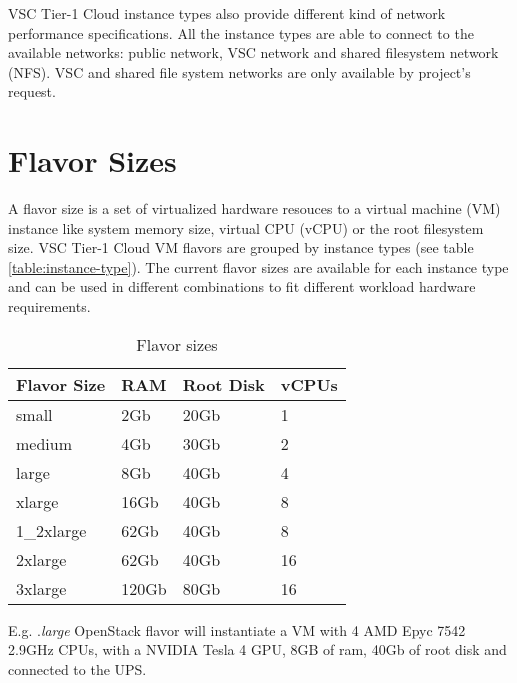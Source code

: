 VSC Tier-1 Cloud instance types also provide different kind of network
performance specifications. All the instance types are able to connect
to the available networks: public network, VSC network and shared filesystem
network (NFS). VSC and shared file system networks are only available
by project's request.

\section{Flavor Sizes}\label{sec:flavor-sizes}
A flavor size is a set of virtualized hardware resouces to a virtual
machine (VM) instance like system memory size, virtual CPU (vCPU)
or the root filesystem size.
VSC Tier-1 Cloud VM flavors are grouped by instance types
(see table \ref{table:instance-type}). The current flavor sizes are
available for each instance type and can be used in different
combinations to fit different workload hardware requirements.

\begin{table}[h!]
\centering
\begin{tabular}{ |p{3cm}|p{3cm}|p{3cm}|p{3cm}| }
  \hline
  \rowcolor{lightgray} \textbf{Flavor Size} & \textbf{RAM} & \textbf{Root Disk} & \textbf{vCPUs} \\
  \hline
  small & 2Gb & 20Gb & 1 \\
  \hline
  medium & 4Gb & 30Gb & 2 \\
  \hline
  large & 8Gb & 40Gb & 4 \\
  \hline
  xlarge & 16Gb & 40Gb & 8 \\
  \hline
  1\_2xlarge & 62Gb & 40Gb & 8 \\
  \hline
  2xlarge & 62Gb & 40Gb & 16 \\
  \hline
  3xlarge & 120Gb & 80Gb & 16 \\
  \hline
\end{tabular}
\caption{Flavor sizes}
\label{table:flavor-size}
\end{table}

E.g. .\emph{large} OpenStack flavor will instantiate a
VM with 4 AMD Epyc 7542 2.9GHz CPUs, with a NVIDIA Tesla 4 GPU, 8GB
of ram, 40Gb of root disk and connected to the UPS.

